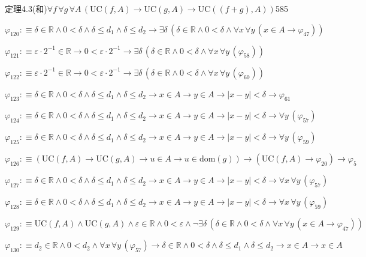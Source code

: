 \begin{fullproof}{定理4.3(和)}{$\forall f\,\forall g\,\forall A\,(\mathrm{UC}(f,A) \to \mathrm{UC}(g,A) \to \mathrm{UC}((f + g),A))$}{585}
\begin{abbrevlist}
\item $\varphi_{120} :\equiv \delta \in \mathbb{R} \land 0 < \delta \land \delta \leq d_{1} \land \delta \leq d_{2} \to \exists \delta\,(\delta \in \mathbb{R} \land 0 < \delta \land \forall x\,\forall y\,(x \in A \to \varphi_{47}))$
\item $\varphi_{121} :\equiv \varepsilon \cdot 2^{-1} \in \mathbb{R} \to 0 < \varepsilon \cdot 2^{-1} \to \exists \delta\,(\delta \in \mathbb{R} \land 0 < \delta \land \forall x\,\forall y\,(\varphi_{58}))$
\item $\varphi_{122} :\equiv \varepsilon \cdot 2^{-1} \in \mathbb{R} \to 0 < \varepsilon \cdot 2^{-1} \to \exists \delta\,(\delta \in \mathbb{R} \land 0 < \delta \land \forall x\,\forall y\,(\varphi_{60}))$
\item $\varphi_{123} :\equiv \delta \in \mathbb{R} \land 0 < \delta \land \delta \leq d_{1} \land \delta \leq d_{2} \to x \in A \to y \in A \to \lvert x - y \rvert < \delta \to \varphi_{61}$
\item $\varphi_{124} :\equiv \delta \in \mathbb{R} \land 0 < \delta \land \delta \leq d_{1} \land \delta \leq d_{2} \to x \in A \to y \in A \to \lvert x - y \rvert < \delta \to \forall y\,(\varphi_{57})$
\item $\varphi_{125} :\equiv \delta \in \mathbb{R} \land 0 < \delta \land \delta \leq d_{1} \land \delta \leq d_{2} \to x \in A \to y \in A \to \lvert x - y \rvert < \delta \to \forall y\,(\varphi_{59})$
\item $\varphi_{126} :\equiv (\mathrm{UC}(f,A) \to \mathrm{UC}(g,A) \to u \in A \to u \in \mathrm{dom}(g)) \to (\mathrm{UC}(f,A) \to \varphi_{20}) \to \varphi_{5}$
\item $\varphi_{127} :\equiv \delta \in \mathbb{R} \land 0 < \delta \land \delta \leq d_{1} \land \delta \leq d_{2} \to x \in A \to y \in A \to \lvert x - y \rvert < \delta \to \forall x\,\forall y\,(\varphi_{57})$
\item $\varphi_{128} :\equiv \delta \in \mathbb{R} \land 0 < \delta \land \delta \leq d_{1} \land \delta \leq d_{2} \to x \in A \to y \in A \to \lvert x - y \rvert < \delta \to \forall x\,\forall y\,(\varphi_{59})$
\item $\varphi_{129} :\equiv \mathrm{UC}(f,A) \land \mathrm{UC}(g,A) \land \varepsilon \in \mathbb{R} \land 0 < \varepsilon \land \neg \exists \delta\,(\delta \in \mathbb{R} \land 0 < \delta \land \forall x\,\forall y\,(x \in A \to \varphi_{47}))$
\item $\varphi_{130} :\equiv d_{2} \in \mathbb{R} \land 0 < d_{2} \land \forall x\,\forall y\,(\varphi_{57}) \to \delta \in \mathbb{R} \land 0 < \delta \land \delta \leq d_{1} \land \delta \leq d_{2} \to x \in A \to x \in A$

\end{abbrevlist}
\end{fullproof}

